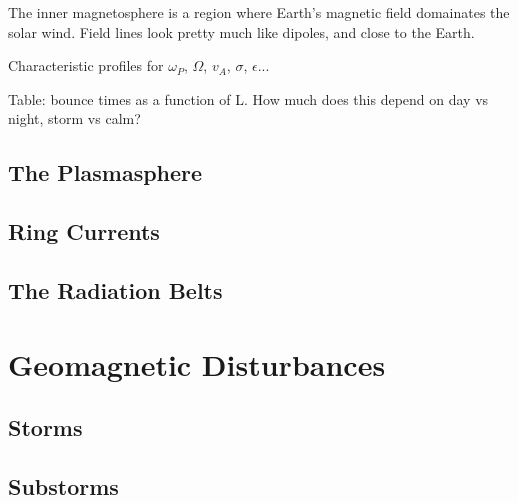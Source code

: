 The inner magnetosphere is a region where Earth's magnetic field domainates the solar wind. Field lines look pretty much like dipoles, and close to the Earth. 

Characteristic profiles for $\omega_P$, $\Omega$, $v_A$, $\sigma$, $\epsilon$...

Table: bounce times as a function of L. How much does this depend on day vs night, storm vs calm? 

\subsection{The Plasmasphere}

\subsection{Ring Currents}

\subsection{The Radiation Belts}

\section{Geomagnetic Disturbances}

\subsection{Storms}

\subsection{Substorms}






